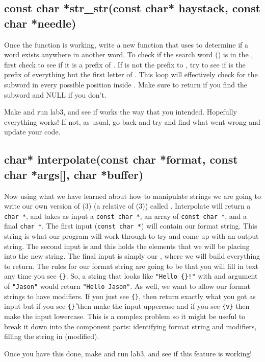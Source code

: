 \documentclass{tufte-handout}
\begin{document}
\subsection{{const char *str\_str(const char* haystack, const
char *needle)}}

Once the function  is working, write a new
function  that uses  to determine if a word exists anywhere in another word. To check if the search word () is in the , first check to see if it is a prefix of . If  is not the prefix to , try to see if  is the prefix of everything but the first letter of . This loop will effectively check for the subword  in every possible position inside . Make sure to return  if you find the subword and NULL if you don't.

Make and run lab3, and see if  works the way that you intended.  Hopefully everything works!  If not, as usual, go back and try and find what went wrong and update your code.

\subsection{{char* interpolate(const char *format, const char *args[], char *buffer)}}

Now using what we have learned about how to manipulate strings we are
going to write our own version of (3) (a relative
of (3)) called
. Interpolate will return a \texttt{char *}, and takes
as input a \texttt{const char *}, an array of \texttt{const char *}, and
a final \texttt{char *}. The
first input (\texttt{const char *})  will contain our format
string. This string is what our program will work through to try and
come up with an output string. The second input is  and
this holds the elements that we will be placing into the new string. The
final input is simply our , where we will build
everything to return. The rules for our format string are going to be
that you will fill in text any time you see \texttt{\{\}}. So, a string that
looks like \texttt{"Hello \{\}!"} with and argument of \texttt{"Jason"} would return
\texttt{"Hello Jason"}. As well, we want to allow our format strings to have
modifiers. If you just see \texttt{\{\}}, then return exactly what you got as
input but if you see \texttt{\{\^\}} then make the input uppercase and if you see
\texttt{\{v\}} then make the input lowercase. This is a complex problem so it might be useful to break it down into the component parts: identifying format string and modifiers, filling the string in (modified).

Once you have this done, make and run lab3, and see if this feature is working!
\end{document}
